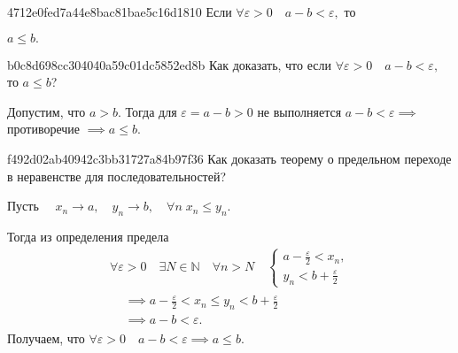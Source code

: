     \begin{note}{4712e0fed7a44e8bac81bae5c16d1810}
        Если \( \forall \varepsilon > 0 \quad a - b < \varepsilon, \) то
        \begin{icloze}{1}\( a \leqslant b. \)\end{icloze}
    \end{note}

    \begin{note}{b0c8d698cc304040a59c01dc5852ed8b}
        Как доказать, что если \( \forall \varepsilon > 0 \quad a - b <
        \varepsilon, \) то \( a \leqslant b \)?

        \begin{cloze}{1}
            Допустим, что \( a > b. \) Тогда для \( \varepsilon = a - b > 0 \)
            не выполняется \( a - b < \varepsilon \implies  \) противоречие \(
            \implies a \leqslant b. \)
        \end{cloze}
    \end{note}

    \begin{note}{f492d02ab40942c3bb31727a84b97f36}
        Как доказать теорему о предельном переходе в неравенстве для
        последовательностей?

        \begin{cloze}{1}
            Пусть \( \quad x_n \to a, \quad y_n \to b, \quad \forall n\; x_n
            \leqslant y_n. \)

            Тогда из определения предела \[
                \begin{gathered}
                    \forall \varepsilon > 0 \quad \exists N \in \mathbb N \quad
                    \forall n > N \quad \begin{cases}
                        a - \frac{\varepsilon}{2} < x_n, \\
                        y_n < b + \frac{\varepsilon}{2}
                    \end{cases} \\
                    \begin{aligned}
                        &\implies a - \frac{\varepsilon}{2} < x_n \leqslant y_n < b + \frac{\varepsilon}{2} \\
                        &\implies a - b < \varepsilon.
                    \end{aligned}
                \end{gathered}
            \]
            Получаем, что \( \forall \varepsilon > 0 \quad a - b < \varepsilon
            \implies a \leqslant b. \)
        \end{cloze}
    \end{note}

